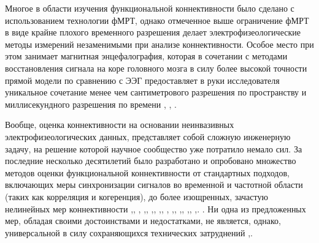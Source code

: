 Многое в области изучения функциональной коннективности было сделано с использованием технологии фМРТ, 
однако отмеченное выше ограничение фМРТ в виде крайне плохого временного разрешения делает электрофизеологические 
методы измерений незаменимыми при анализе коннективности. Особое место при этом занимает магнитная энцефалография, 
которая в сочетании с методами восстановления сигнала на коре головного мозга
в силу более высокой точности прямой модели по сравнению с ЭЭГ предоставляет
в руки исследователя уникальное сочетание менее чем сантиметрового разрешения по пространству
и миллисекундного разрешения по времени , 
, . 

Вообще, оценка коннективности на основании неинвазивных электрофизеологических данных,
 представляет собой сложную инженерную задачу,
на решение которой научное сообщество уже потратило немало сил.
За последние несколько десятилетий было разработано и опробовано множество методов
оценки функциональной коннективности от стандартных подходов,
включающих меры синхронизации сигналов во временной и
частотной области (таких как корреляция и когеренция), до более изощренных,
зачастую нелинейных мер коннективности
,,
,
,,
,,
,,
,
,,
,,
,,
,.
.
Ни одна из предложенных мер, обладая своими достоинствами и недостатками, не является, однако, универсальной в силу 
сохраняющихся технических затруднений ,.

